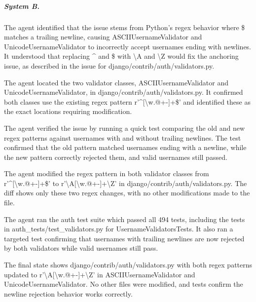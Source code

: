 \subparagraph{System B.}
\begin{description}[itemsep=1pt, topsep=2pt]\small
\item[understanding] The agent identified that the issue stems from Python's regex behavior where \$ matches a trailing newline, causing ASCIIUsernameValidator and UnicodeUsernameValidator to incorrectly accept usernames ending with newlines. It understood that replacing \textasciicircum{} and \$ with \textbackslash{}A and \textbackslash{}Z would fix the anchoring issue, as described in the issue for django/contrib/auth/validators.py.
\item[localization] The agent located the two validator classes, ASCIIUsernameValidator and UnicodeUsernameValidator, in django/contrib/auth/validators.py. It confirmed both classes use the existing regex pattern r'\textasciicircum{}[\textbackslash{}w.@+-]+\$' and identified these as the exact locations requiring modification.
\item[reproduction] The agent verified the issue by running a quick test comparing the old and new regex patterns against usernames with and without trailing newlines. The test confirmed that the old pattern matched usernames ending with a newline, while the new pattern correctly rejected them, and valid usernames still passed.
\item[editing] The agent modified the regex pattern in both validator classes from r'\textasciicircum{}[\textbackslash{}w.@+-]+\$' to r'\textbackslash{}A[\textbackslash{}w.@+-]+\textbackslash{}Z' in django/contrib/auth/validators.py. The diff shows only these two regex changes, with no other modifications made to the file.
\item[verification] The agent ran the auth test suite which passed all 494 tests, including the tests in auth\_tests/test\_validators.py for UsernameValidatorsTests. It also ran a targeted test confirming that usernames with trailing newlines are now rejected by both validators while valid usernames still pass.
\item[final state] The final state shows django/contrib/auth/validators.py with both regex patterns updated to r'\textbackslash{}A[\textbackslash{}w.@+-]+\textbackslash{}Z' in ASCIIUsernameValidator and UnicodeUsernameValidator. No other files were modified, and tests confirm the newline rejection behavior works correctly.
\end{description}
